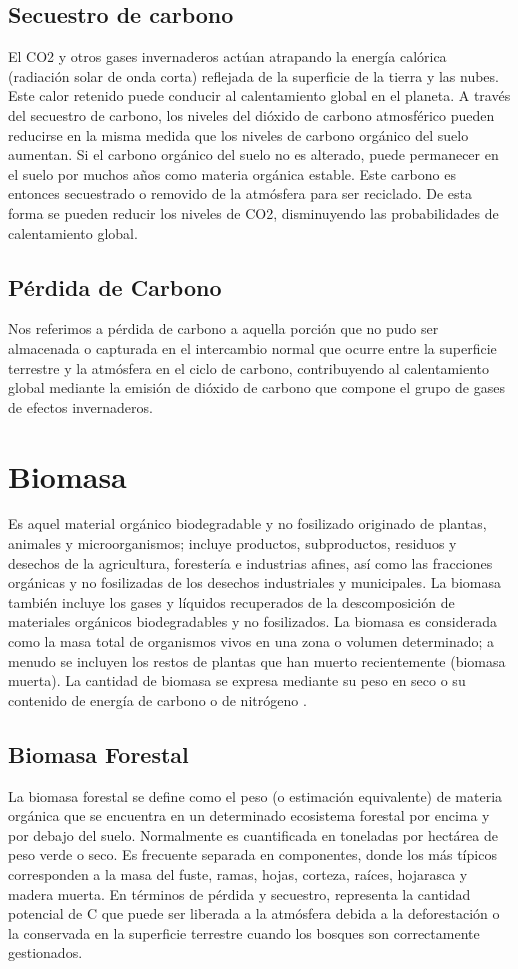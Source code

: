 \subsection{Secuestro de carbono}
El CO2 y otros gases invernaderos actúan atrapando la energ\'ia cal\'orica (radiación solar de onda corta) reflejada de la superficie de la tierra y las nubes. Este calor retenido puede conducir al calentamiento global en el planeta. A trav\'es del secuestro de carbono, los niveles del di\'oxido de carbono atmosf\'erico pueden reducirse en la misma medida que los niveles de carbono org\'anico del suelo aumentan. Si el carbono org\'anico del suelo no es alterado, puede permanecer en el suelo por muchos a\~{n}os como materia org\'anica estable. Este carbono es entonces secuestrado o removido de la atm\'osfera para ser reciclado. De esta forma se pueden reducir los niveles de CO2, disminuyendo las probabilidades de calentamiento global\cite{encaptura}.
\subsection{P\'erdida de Carbono}
Nos referimos a p\'erdida de carbono a aquella porci\'on que no pudo ser almacenada o capturada en el intercambio normal que ocurre entre la superficie terrestre y la atm\'osfera en el ciclo de carbono, contribuyendo al calentamiento global mediante la emisión de di\'oxido de carbono que compone el grupo de gases de efectos invernaderos.
\section{Biomasa}
Es aquel material org\'anico biodegradable y no fosilizado originado de plantas, animales y microorganismos; incluye productos, subproductos, residuos y desechos de la agricultura, forester\'ia e industrias afines, as\'i como las fracciones org\'anicas y no fosilizadas de los desechos industriales y municipales. La biomasa tambi\'en incluye los gases y l\'iquidos recuperados de la descomposici\'on de materiales org\'anicos biodegradables y no fosilizados\cite{salinas2008guia}.
La biomasa es considerada como la masa total de organismos vivos en una zona o volumen determinado; a menudo se incluyen los restos de plantas que han muerto recientemente (biomasa muerta). La cantidad de biomasa se expresa mediante su peso en seco o su contenido de energ\'ia de carbono o de nitr\'ogeno \cite{garciduenas1987produccion}.
\subsection{Biomasa Forestal}
La biomasa forestal se define como el peso (o estimaci\'on equivalente) de materia org\'anica que
se encuentra en un determinado ecosistema forestal por encima y por debajo del suelo. Normalmente es
cuantificada en toneladas por hect\'area de peso verde o seco. Es frecuente separada en
componentes, donde los m\'as t\'ipicos corresponden a la masa del fuste, ramas, hojas, corteza,
raíces, hojarasca y madera muerta\cite{schlegel2000manual}. 
En t\'erminos de p\'erdida y secuestro, representa la cantidad potencial de C que puede ser liberada a la atm\'osfera debida a la deforestaci\'on o la conservada en la superficie terrestre cuando los bosques son correctamente gestionados\cite{lu2005exploring}.
